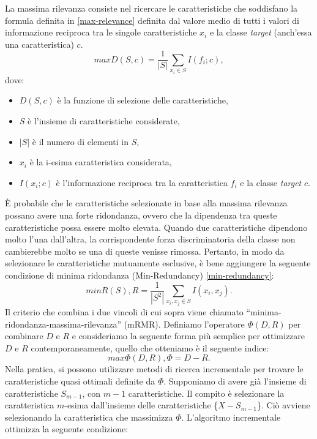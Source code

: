 \documentclass[12pt,italian]{report}
\begin{document}
	La massima rilevanza consiste nel ricercare le caratteristiche che soddisfano la formula definita in \ref{max-relevance} definita dal valore medio di tutti i valori di informazione reciproca tra le singole caratteristiche $x_i$ e la classe \textit{target} (anch'essa una caratteristica) $c$.
	\begin{equation}
		max D(S,c) = \frac{1}{|S|} \sum_{x_{i} \in S} I(f_{i};c),
		\label{max-relevance}
	\end{equation}
	dove:
	\begin{itemize}
		\item $D(S,c)$ è la funzione di selezione delle caratteristiche,
		\item $S$ è l'insieme di caratteristiche considerate,
		\item $|S|$ è il numero di elementi in $S$,
		\item $x_i$ è la i-esima caratteristica considerata,
		\item $I(x_i;c)$ è l'informazione reciproca tra la caratteristica $f_i$ e la classe \textit{target} $c$.
	\end{itemize}
	È probabile che le caratteristiche selezionate in base alla massima rilevanza possano avere una forte ridondanza, ovvero che la dipendenza tra queste caratteristiche possa essere molto elevata. Quando due caratteristiche dipendono molto l'una dall'altra, la corrispondente forza discriminatoria della classe non cambierebbe molto se una di queste venisse rimossa. Pertanto, in modo da selezionare le caratteristiche mutuamente esclusive, è bene aggiungere la seguente condizione di minima ridondanza (Min-Redundancy) \ref{min-redundancy}:
	\begin{equation}
		min R(S), R=\frac{1}{|S^2|}\sum_{x_i, x_j \in S}^{} I(x_i, x_j).
		\label{min-redundancy}
	\end{equation}
	Il criterio che combina i due vincoli di cui sopra viene chiamato ``minima-ridondanza-massima-rilevanza'' (mRMR). Definiamo l'operatore $\Phi(D,R)$ per combinare $D$ e $R$ e consideriamo la seguente forma più semplice per ottimizzare $D$ e $R$ contemporaneamente, quello che otteniamo è il seguente indice:
	\begin{equation}
		max \Phi(D,R), \Phi = D - R.
		\label{indice}
	\end{equation}
	Nella pratica, si possono utilizzare metodi di ricerca incrementale per trovare le caratteristiche quasi ottimali definite da $\Phi$. Supponiamo di avere già l'insieme di caratteristiche $S_{m-1}$, con $m-1$ caratteristiche. Il compito è selezionare la caratteristica $m$-esima dall'insieme delle caratteristiche \{$X-S_{m-1}$\}. Ciò avviene selezionando la caratteristica che massimizza $\Phi$. L'algoritmo incrementale ottimizza la seguente condizione:
\end{document}
